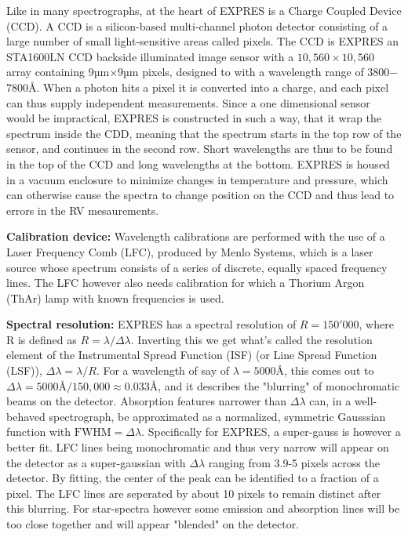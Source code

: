Like in many spectrographs, at the heart of EXPRES is a Charge Coupled Device (CCD). A CCD is a silicon-based multi-channel photon detector consisting of a large number of small light-sensitive areas called pixels. The CCD is EXPRES an STA1600LN CCD backside illuminated image sensor with a $10,560 \times 10,560$ array containing 9µm$\times$9µm pixels, designed to with a wavelength range of 3800$-$7800Å. When a photon hits a pixel it is converted into a charge, and each pixel can thus supply independent measurements. Since a one dimensional sensor would be impractical, EXPRES is constructed in such a way, that it wrap the spectrum inside the CDD, meaning that the spectrum starts in the top row of the sensor, and continues in the second row. Short wavelengths are thus to be found in the top of the CCD and long wavelengths at the bottom.
EXPRES is housed in a vacuum enclosure to minimize changes in temperature and pressure, which can otherwise cause the spectra to change position on the CCD and thus lead to errors in the RV mesaurements. 

\bigbreak
\noindent\textbf{Calibration device:}
Wavelength calibrations are performed with the use of a Laser Frequency Comb 
(LFC), produced by Menlo Systems, which is a laser source whose spectrum consists of a series of discrete, equally spaced frequency lines. The LFC however also needs calibration for which a Thorium Argon (ThAr) lamp with known frequencies is used.

\bigbreak
\noindent\textbf{Spectral resolution:}
EXPRES has a spectral resolution of $R = 150'000$, where R is defined as $R = \lambda / \Delta\lambda$. Inverting this we get what's called the resolution element of the Instrumental Spread Function (ISF) (or Line Spread Function (LSF)), $\Delta\lambda = \lambda/R$. For a wavelength of say of $\lambda = 5000$Å, this comes out to $\Delta\lambda = 5000\text{Å}/150,000 \approx 0.033 $Å, and it describes the "blurring" of monochromatic beams on the detector. Absorption features narrower than $\Delta\lambda$ can, in a well-behaved spectrograph, be approximated as a normalized, symmetric Gausssian function with $\text{FWHM} = \Delta\lambda$. Specifically for EXPRES, a super-gauss is however a better fit. LFC lines being monochromatic and thus very narrow will appear on the detector as a super-gaussian with $\Delta\lambda$ ranging from 3.9-5 pixels across the detector. By fitting, the center of the peak can be identified to a fraction of a pixel. The LFC lines are seperated by about 10 pixels to remain distinct after this blurring. For star-spectra however some emission and absorption lines will be too close together and will appear "blended" on the detector. 

